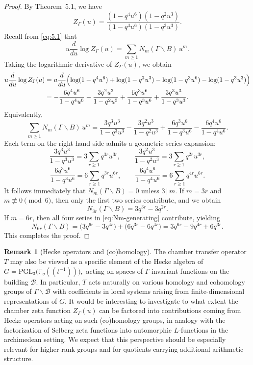 \documentclass[11pt]{amsart}
\theoremstyle{definition}
\newtheorem{remark}[thm]{Remark}
\theoremstyle{remark}
\numberwithin{equation}{section}
\begin{document}
\begin{proof}
By Theorem~5.1, we have
\[
Z_\Gamma(u)
=
\frac{(1-q^{4}u^{6})(1-q^{2}u^{3})}{(1-q^{3}u^{6})(1-q^{3}u^{3})}.
\]
Recall from \eqref{eq:5.1} that
\[
u\frac{d}{du}\log Z_\Gamma(u)
=
\sum_{m\ge1} N_m(\Gamma\backslash B)\,u^m.
\]
Taking the logarithmic derivative of $Z_\Gamma(u)$, we obtain
\begin{align*}
u\frac{d}{du}\log Z_\Gamma(u)
&=
u\frac{d}{du}\Bigl(
\log(1-q^{4}u^{6})
+
\log(1-q^{2}u^{3})
-
\log(1-q^{3}u^{6})
-
\log(1-q^{3}u^{3})
\Bigr) \\
&=
-\frac{6q^{4}u^{6}}{1-q^{4}u^{6}}
-\frac{3q^{2}u^{3}}{1-q^{2}u^{3}}
+\frac{6q^{3}u^{6}}{1-q^{3}u^{6}}
+\frac{3q^{3}u^{3}}{1-q^{3}u^{3}}.
\end{align*}
Equivalently,
\begin{equation}\label{eq:Nm-generating}
\sum_{m\ge1} N_m(\Gamma\backslash B)\,u^m
=
\frac{3q^{3}u^{3}}{1-q^{3}u^{3}}
-
\frac{3q^{2}u^{3}}{1-q^{2}u^{3}}
+
\frac{6q^{3}u^{6}}{1-q^{3}u^{6}}
-
\frac{6q^{4}u^{6}}{1-q^{4}u^{6}}.
\end{equation}
Each term on the right-hand side admits a geometric series expansion:
\[
\frac{3q^{3}u^{3}}{1-q^{3}u^{3}}
=
3\sum_{r\ge1} q^{3r}u^{3r},
\qquad
\frac{3q^{2}u^{3}}{1-q^{2}u^{3}}
=
3\sum_{r\ge1} q^{2r}u^{3r},
\]
\[
\frac{6q^{3}u^{6}}{1-q^{3}u^{6}}
=
6\sum_{r\ge1} q^{3r}u^{6r},
\qquad
\frac{6q^{4}u^{6}}{1-q^{4}u^{6}}
=
6\sum_{r\ge1} q^{4r}u^{6r}.
\]
It follows immediately that $N_m(\Gamma\backslash B)=0$ unless $3\,|\, m$.
If $m=3r$ and $m\not\equiv 0 \pmod{6}$, then only the first two series contribute,
and we obtain
\[
N_{3r}(\Gamma\backslash B)
=
3q^{3r}-3q^{2r}.
\]
If $m=6r$, then all four series in \eqref{eq:Nm-generating} contribute, yielding
\[
N_{6r}(\Gamma\backslash B)
=
\bigl(3q^{6r}-3q^{4r}\bigr)
+
\bigl(6q^{3r}-6q^{4r}\bigr)
=
3q^{6r}-9q^{4r}+6q^{3r}.
\]
This completes the proof.
\end{proof}


\begin{remark}[Hecke operators and (co)homology]
The chamber transfer operator $T$ may also be viewed as a specific element of the Hecke algebra of
\(
G=\mathrm{PGL}_3\bigl(\mathbb{F}_q(\!(t^{-1})\!)\bigr),
\)
acting on spaces of $\Gamma$-invariant functions on the building $\mathcal{B}$. In particular, $T$ acts naturally on various homology and cohomology groups of $\Gamma\backslash\mathcal{B}$ with coefficients in local systems arising from finite-dimensional representations of $G$. It would be interesting to investigate to what extent the chamber zeta function $Z_{\Gamma}(u)$ can be factored into contributions coming from Hecke operators acting on such (co)homology groups, in analogy with the factorization of Selberg zeta functions into automorphic $L$-functions in the archimedean setting. We expect that this perspective should be especially relevant for higher-rank groups and for quotients carrying additional arithmetic structure.
\end{remark}
\end{document}
